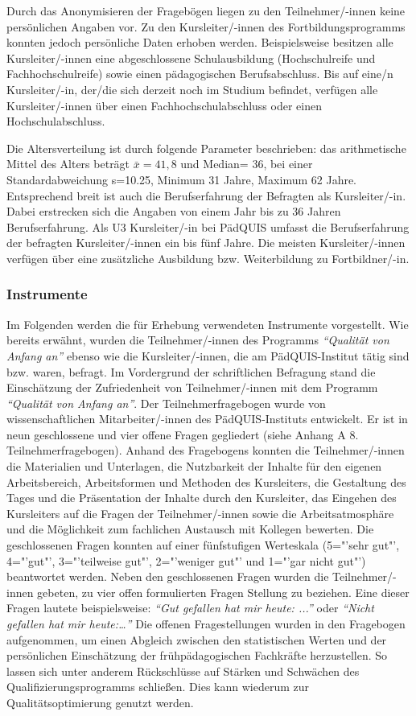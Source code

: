 \documentclass[12pt,a4paper]{article}
\begin{document}
Durch das Anonymisieren der Fragebögen liegen zu den Teilnehmer/-innen keine persönlichen Angaben vor. Zu den Kursleiter/-innen des Fortbildungsprogramms konnten jedoch persönliche Daten erhoben werden. Beispielsweise besitzen alle Kursleiter/-innen eine abgeschlossene Schulausbildung (Hochschulreife und Fachhochschulreife) so\-wie einen pädagogischen Berufsabschluss. Bis auf eine/n Kursleiter/-in, der/die sich derzeit noch im Studium befindet, verfügen alle Kursleiter/-innen über einen Fachhochschulabschluss oder einen Hochschulabschluss. 

Die Al\-ters\-ver\-teil\-ung ist durch folgende Parameter beschrieben: das arithmetische Mittel des Alters beträgt $\bar x= 41,8$ und Median= 36, bei einer Standardabweichung s=10.25, Minimum 31 Jahre, Maximum 62 Jahre. Entsprechend breit ist auch die Berufserfahrung der Befragten als Kursleiter/-in. Dabei erstrecken sich die Angaben von einem Jahr bis zu 36 Jahren Berufserfahrung. Als U3 Kursleiter/-in bei PädQUIS umfasst die Berufserfahrung der befragten Kursleiter/-innen ein bis fünf Jahre. Die meisten Kursleiter/-innen verfügen über eine zusätzliche Ausbildung bzw. Weiterbildung zu Fortbildner/-in.

\subsubsection{Instrumente}

Im Folgenden werden die für Erhebung verwendeten Instrumente vorgestellt. Wie bereits erwähnt, wurden die Teilnehmer/-innen des Programms \textit{"`Qualität von Anfang an"'} ebenso wie die Kursleiter/-innen, die am PädQUIS-Institut tätig sind bzw. waren, befragt. Im Vordergrund der schriftlichen Befragung stand die Einschätzung der Zufriedenheit von Teilnehmer/-innen mit dem Programm \textit{"`Qualität von Anfang an"'}. Der Teilnehmerfragebogen wurde von wissenschaftlichen Mitarbeiter/-innen des PädQUIS-Instituts entwickelt. Er ist in neun geschlossene und vier offene Fragen  gegliedert (siehe Anhang A 8. Teilnehmerfragebogen).
Anhand des Fragebogens konnten die Teilnehmer/-innen die Materialien und Unterlagen, die Nutzbarkeit der Inhalte für den eigenen Arbeitsbereich, Arbeitsformen und Methoden des Kursleiters, die Gestaltung des Tages und die Präsentation der Inhalte durch den Kursleiter, das Eingehen des Kursleiters auf die Fragen der Teilnehmer/-innen sowie die Arbeitsatmosphäre und die Möglichkeit zum fachlichen Austausch mit Kollegen bewerten. Die geschlossenen Fragen konnten auf einer fünfstufigen Werteskala (5="'sehr gut"', 4="'gut"', 3="'teilweise gut"', 2="'weniger gut"' und 1="'gar nicht gut"') beantwortet werden. Neben den geschlossenen Fragen wurden die Teilnehmer/-innen gebeten, zu vier offen formulierten Fragen Stellung zu beziehen. Eine dieser Fragen lautete beispielsweise: \textit{"`Gut gefallen hat mir heute: ..."'} oder \textit{"`Nicht gefallen hat mir heute:…"'} Die offenen Fragestellungen wurden in den Fragebogen aufgenommen, um einen Abgleich zwischen den statistischen Werten und der persönlichen Einschätzung der frühpädagogischen Fachkräfte herzustellen. So lassen sich unter anderem Rückschlüsse auf Stärken und Schwächen des Qualifizierungsprogramms schließen. Dies kann wiederum zur Qualitätsoptimierung genutzt werden.
\end{document}
